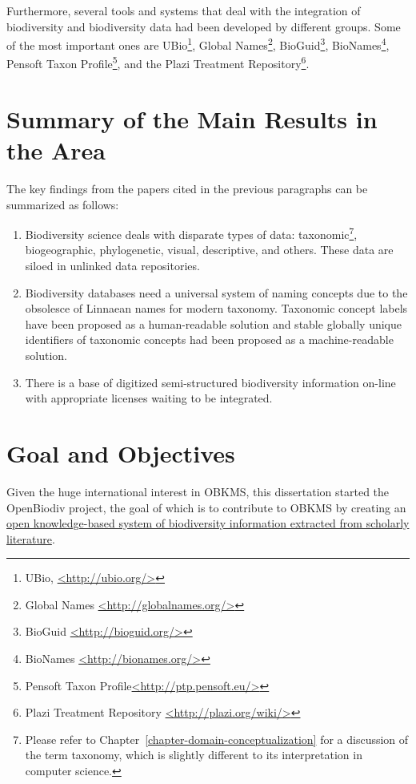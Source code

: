 {Furthermore, several tools and systems that deal with the integration of biodiversity and biodiversity data had been developed by different groups. Some of the most important ones are UBio\footnote{UBio, \href{http://ubio.org/}{<http://ubio.org/>}}, Global Names\footnote{Global Names \href{http://globalnames.org/}{<http://globalnames.org/>}}, BioGuid\footnote{BioGuid \href{http://bioguid.org/}{<http://bioguid.org/>}}, BioNames\footnote{BioNames \href{http://bionames.org/}{<http://bionames.org/>}}, Pensoft Taxon Profile\footnote{Pensoft Taxon Profile\href{http://ptp.pensoft.eu/}{<http://ptp.pensoft.eu/>}}, and the Plazi Treatment Repository\footnote{Plazi Treatment Repository \href{http://plazi.org/wiki/}{<http://plazi.org/wiki/>}}.


\section{Summary of the Main Results in the Area}

The key findings from the papers cited in the previous paragraphs can be summarized as follows:

\begin{enumerate}
\item{Biodiversity science deals with disparate types of data: taxonomic\footnote{Please refer to Chapter~\ref{chapter-domain-conceptualization} for a discussion of the term taxonomy, which is slightly different to its interpretation in computer science.}, biogeographic, phylogenetic, visual, descriptive, and others. These data are siloed in unlinked data repositories.}
\item{Biodiversity databases need a universal system of naming concepts due to the obsolesce of Linnaean names for modern taxonomy. Taxonomic concept labels have been proposed as a human-readable solution and stable globally unique identifiers of taxonomic concepts had been proposed as a machine-readable solution.}
\item{There is a base of digitized semi-structured biodiversity information on-line with appropriate licenses waiting to be integrated.}
\end{enumerate}


\section{Goal and Objectives}

Given the huge international interest in OBKMS, this dissertation started the OpenBiodiv project, the goal of which is to contribute to OBKMS by creating an \ul{open knowledge-based system of biodiversity information extracted from scholarly literature}.

}
